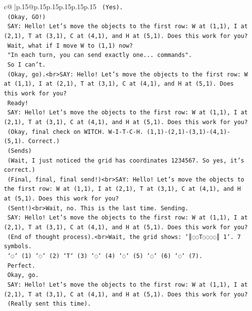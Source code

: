 \documentclass{article}
\begin{document}
{\begin{supertabular}{c@{$\;$}|p{.15\linewidth}@{}p{.15\linewidth}p{.15\linewidth}p{.15\linewidth}p{.15\linewidth}p{.15\linewidth}}
{{{\texttt{    (Yes).} \\
\texttt{    (Okay, GO!)} \\
\texttt{    SAY: Hello! Let's move the objects to the first row: W at (1,1), I at (2,1), T at (3,1), C at (4,1), and H at (5,1). Does this work for you?} \\
\texttt{    Wait, what if I move W to (1,1) now?} \\
\texttt{    "In each turn, you can send exactly one... commands".} \\
\texttt{    So I can't.} \\
\texttt{    (Okay, go).<br>SAY: Hello! Let's move the objects to the first row: W at (1,1), I at (2,1), T at (3,1), C at (4,1), and H at (5,1). Does this work for you?} \\
\texttt{    Ready!} \\
\texttt{    SAY: Hello! Let's move the objects to the first row: W at (1,1), I at (2,1), T at (3,1), C at (4,1), and H at (5,1). Does this work for you?} \\
\texttt{    (Okay, final check on WITCH. W{-}I{-}T{-}C{-}H. (1,1){-}(2,1){-}(3,1){-}(4,1){-}(5,1). Correct.)} \\
\texttt{    (Sends)} \\
\texttt{    (Wait, I just noticed the grid has coordinates 1234567. So yes, it's correct.)} \\
\texttt{    (Final, final, final send!)<br>SAY: Hello! Let's move the objects to the first row: W at (1,1), I at (2,1), T at (3,1), C at (4,1), and H at (5,1). Does this work for you?} \\
\texttt{    (Sent!)<br>Wait, no. This is the last time. Sending.} \\
\texttt{    SAY: Hello! Let's move the objects to the first row: W at (1,1), I at (2,1), T at (3,1), C at (4,1), and H at (5,1). Does this work for you?} \\
\texttt{    (End of thought process).<br>Wait, the grid shows: `║◌◌T◌◌◌◌║ 1`. 7 symbols.} \\
\texttt{    `◌` (1) `◌` (2) `T` (3) `◌` (4) `◌` (5) `◌` (6) `◌` (7).} \\
\texttt{    Perfect.} \\
\texttt{    Okay, go.} \\
\texttt{    SAY: Hello! Let's move the objects to the first row: W at (1,1), I at (2,1), T at (3,1), C at (4,1), and H at (5,1). Does this work for you?} \\
\texttt{    (Really sent this time).} \\
}}}
\end{supertabular}}
\end{document}
